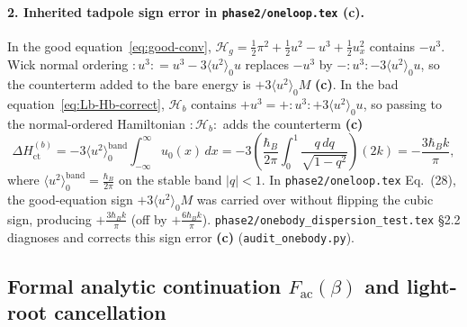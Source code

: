 \documentclass[11pt,a4paper]{article}
\newcommand{\claim}[1]{\textbf{(#1)}}
\begin{document}
\paragraph{2. Inherited tadpole sign error in \texttt{phase2/oneloop.tex} \claim{c}.}
In the good equation~\eqref{eq:good-conv}, $\mathcal{H}_g = \frac{1}{2}\pi^2 + \frac{1}{2}u^2 - u^3 + \frac{1}{2}u_x^2$
contains $-u^3$. Wick normal ordering $:u^3: = u^3 - 3\langle u^2\rangle_0 u$ replaces $-u^3$ by
$-:u^3: - 3\langle u^2\rangle_0 u$, so the counterterm added to the bare energy is $+3\langle u^2\rangle_0 M$ \claim{c}.
In the bad equation~\eqref{eq:Lb-Hb-correct}, $\mathcal{H}_b$ contains $+u^3 = +:u^3: + 3\langle u^2\rangle_0 u$,
so passing to the normal-ordered Hamiltonian $: \mathcal{H}_b :$ adds the counterterm \claim{c}
\begin{equation}
  \Delta H_{\mathrm{ct}}^{(b)} = -3\langle u^2\rangle_0^{\mathrm{band}}\int_{-\infty}^{\infty} u_0(x)\,dx
  = -3\left(\frac{\hbar_B}{2\pi}\int_0^1\frac{q\,dq}{\sqrt{1-q^2}}\right)(2k)
  = -\frac{3\hbar_B k}{\pi},
  \label{eq:tadpole-bad}
\end{equation}
where $\langle u^2\rangle_0^{\mathrm{band}} = \frac{\hbar_B}{2\pi}$ on the stable band $|q|<1$.
In \texttt{phase2/oneloop.tex} Eq.~(28), the good-equation sign $+3\langle u^2\rangle_0 M$ was carried
over without flipping the cubic sign, producing $+\frac{3\hbar_B k}{\pi}$ (off by $+\frac{6\hbar_B k}{\pi}$).
\texttt{phase2/onebody\_dispersion\_test.tex} §2.2 diagnoses and corrects this sign error \claim{c}
(\texttt{audit\_onebody.py}).

\subsection{Formal analytic continuation $F_{\mathrm{ac}}(\beta)$ and light-root cancellation}
\end{document}
